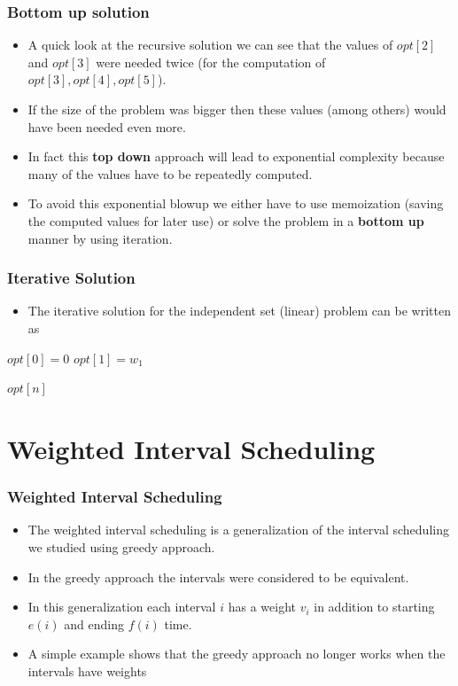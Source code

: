 \documentclass{beamer}
\begin{document}
\begin{frame}
  \frametitle{Bottom up solution}
  \begin{itemize}
  \item A quick look at the recursive solution we can see that the values of $opt[2]$ and $opt[3]$ were needed twice (for the computation of $opt[3],opt[4],opt[5]$).
  \item If the size of the problem was bigger then these values (among others) would have been needed even more.
  \item In fact this \textbf{top down} approach will lead to exponential complexity because many of the values have to be repeatedly computed.
 \item To avoid this exponential blowup we either have to use memoization (saving the computed values for later use) or solve the problem in a \textbf{ bottom up} manner by using iteration.
  \end{itemize}
\end{frame}
\begin{frame}
  \frametitle{Iterative Solution}
  \begin{itemize}
  \item The iterative solution for the independent set (linear) problem can be written as
\end{itemize}


\begin{center}
  \begin{algorithm}[H]
 
  \DontPrintSemicolon
  \BlankLine

$opt[0]=0$\;
$opt[1]=w_1$\;

\Return $opt[n]$\;  
\end{algorithm}

  
 \end{center}
 \end{frame}
\section{Weighted Interval Scheduling}

\begin{frame}
  \frametitle{Weighted Interval Scheduling}
  \begin{itemize}
  \item The weighted interval scheduling is a generalization of the interval scheduling we studied using greedy approach.
  \item In the greedy approach the intervals were considered to be equivalent.
  \item In this generalization each interval $i$ has a weight $v_i$ in addition to starting $e(i)$ and ending $f(i)$ time.
  \item A simple example shows that the greedy approach no longer works when the intervals have weights
  \end{itemize}
\end{frame}
\end{document}
